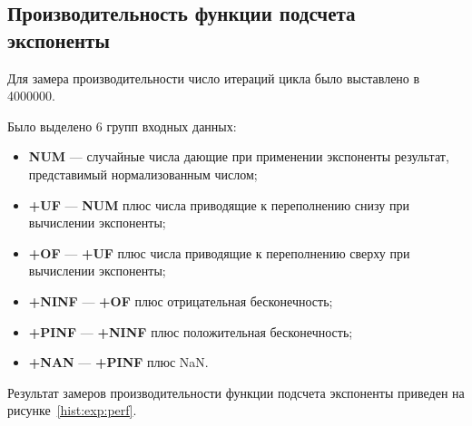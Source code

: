 \subsection{Производительность функции подсчета экспоненты}

Для замера производительности число итераций цикла было выставлено в 4000000.

Было выделено 6 групп входных данных:

\begin{itemize}
    \item \textbf{NUM} --- случайные числа дающие при применении экспоненты результат, представимый нормализованным числом;
    \item \textbf{+UF} --- \textbf{NUM} плюс числа приводящие к переполнению снизу при вычислении экспоненты;
    \item \textbf{+OF} --- \textbf{+UF} плюс числа приводящие к переполнению сверху при вычислении экспоненты;
    \item \textbf{+NINF} --- \textbf{+OF} плюс отрицательная бесконечность;
    \item \textbf{+PINF} --- \textbf{+NINF} плюс положительная бесконечность;
    \item \textbf{+NAN} --- \textbf{+PINF} плюс NaN.
\end{itemize}

Результат замеров производительности функции подсчета экспоненты приведен на рисунке~\ref{hist:exp:perf}.


